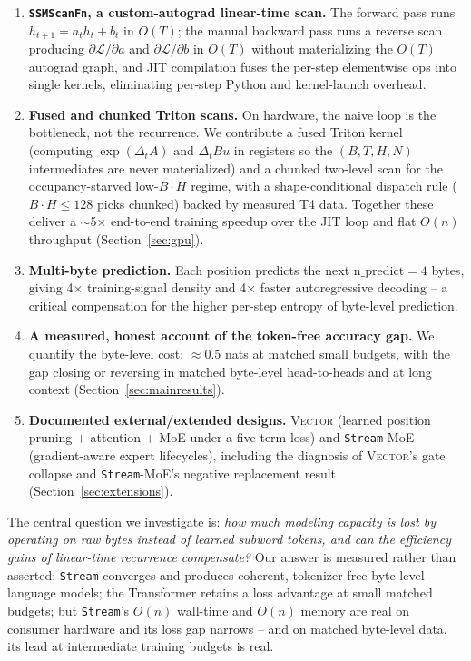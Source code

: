 \documentclass[11pt]{article}
\newcommand{\loss}{\mathcal{L}}
\newcommand{\Stream}{\texttt{Stream}}
\newcommand{\Vector}{{\scshape Vector}}
\begin{document}
\begin{enumerate}
  \item \textbf{\texttt{SSMScanFn}, a custom-autograd linear-time scan.} The
        forward pass runs $h_{t+1}=a_t h_t+b_t$ in $O(T)$; the manual backward
        pass runs a reverse scan producing $\partial\loss/\partial a$ and
        $\partial\loss/\partial b$ in $O(T)$ without materializing the $O(T)$
        autograd graph, and JIT compilation fuses the per-step elementwise ops
        into single kernels, eliminating per-step Python and kernel-launch
        overhead.
  \item \textbf{Fused and chunked Triton scans.} On hardware, the naive loop is
        the bottleneck, not the recurrence. We contribute a fused Triton kernel
        (computing $\exp(\Delta_t A)$ and $\Delta_t B u$ in registers so the
        $(B,T,H,N)$ intermediates are never materialized) and a chunked
        two-level scan for the occupancy-starved low-$B\cdot H$ regime, with a
        shape-conditional dispatch rule ($B\cdot H\le128$ picks chunked) backed
        by measured T4 data. Together these deliver a $\sim$5$\times$
        end-to-end training speedup over the JIT loop and flat $O(n)$
        throughput (Section~\ref{sec:gpu}).
  \item \textbf{Multi-byte prediction.} Each position predicts the next
        $\mathrm{n\_predict}=4$ bytes, giving 4$\times$ training-signal density
        and 4$\times$ faster autoregressive decoding -- a critical compensation
        for the higher per-step entropy of byte-level prediction.
  \item \textbf{A measured, honest account of the token-free accuracy gap.}
        We quantify the byte-level cost: $\approx$0.5 nats at matched small
        budgets, with the gap closing or reversing in matched byte-level
        head-to-heads and at long context (Section~\ref{sec:mainresults}).
  \item \textbf{Documented external/extended designs.} \Vector{} (learned
        position pruning + attention + MoE under a five-term loss) and
        \Stream{}-MoE (gradient-aware expert lifecycles), including the
        diagnosis of \Vector{}'s gate collapse and \Stream{}-MoE's negative
        replacement result (Section~\ref{sec:extensions}).
\end{enumerate}

The central question we investigate is: \emph{how much modeling capacity is
lost by operating on raw bytes instead of learned subword tokens, and can the
efficiency gains of linear-time recurrence compensate?} Our answer is measured
rather than asserted: \Stream{} converges and produces coherent, tokenizer-free
byte-level language models; the Transformer retains a loss advantage at small
matched budgets; but \Stream{}'s $O(n)$ wall-time and $O(n)$ memory are real on
consumer hardware and its loss gap narrows -- and on matched byte-level data,
its lead at intermediate training budgets is real.
\end{document}
